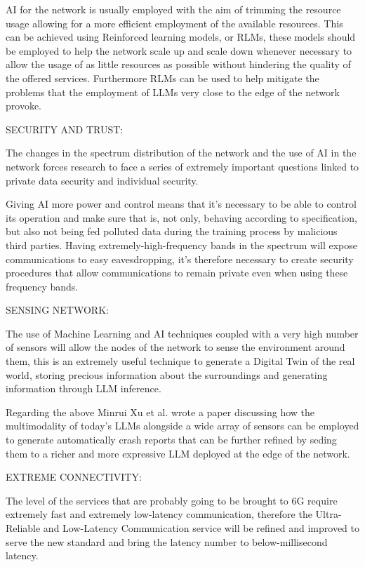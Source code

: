 AI for the network is usually employed with the aim of trimming the resource usage allowing for a
more efficient employment of the available resources. This can be achieved using Reinforced learning models, or RLMs, these models should be
employed to help the network scale up and scale down whenever necessary to allow the usage of as
little resources as possible without hindering the quality of the offered services. Furthermore RLMs can be
used to help mitigate the problems that the employment of LLMs very close to the edge of the network
provoke.

\bigskip
\noindent
SECURITY AND TRUST:
\label{ssec:security-trust}

The changes in the spectrum distribution of the network and the use of AI in the network forces
research to face a series of extremely important questions linked to private data security and
individual security.

Giving AI more power and control means that it's necessary to be able to
control its operation and make sure that is, not only, behaving according to specification, but also
not being fed polluted data during the training process by malicious third parties. Having extremely-high-frequency bands in the spectrum will expose communications to easy
eavesdropping, it's therefore necessary to create security procedures that allow communications to
remain private even when using these frequency bands.

\bigskip
\noindent
SENSING NETWORK:
\label{ssec:sensing-network}

The use of Machine Learning and AI techniques coupled with a very high number of sensors will allow
the nodes of the network to sense the environment around them, this is an extremely useful technique to generate a Digital Twin of the real world, storing precious information about the surroundings and generating information through LLM inference.

Regarding the above Minrui Xu et al. \cite{pga} wrote a paper discussing how the multimodality of today’s LLMs alongside a wide array of sensors can be employed to generate automatically crash reports that can be further refined by seding them to a richer and more expressive LLM deployed at the edge of the network.

\bigskip
\noindent
EXTREME CONNECTIVITY:
\label{ssec:extreme-connectivity}

The level of the services that are probably going to be brought to 6G require extremely fast and extremely
low-latency communication, therefore the Ultra-Reliable and Low-Latency Communication service will be refined and improved to serve the new standard and bring the latency number to below-millisecond latency.


